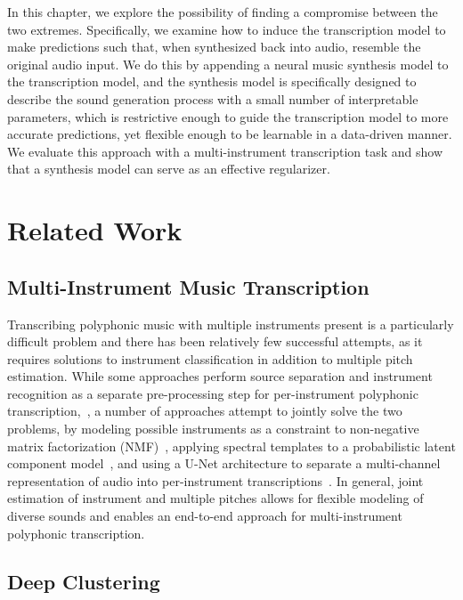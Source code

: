 In this chapter, we explore the possibility of finding a compromise between the two extremes.
Specifically, we examine how to induce the transcription model to make predictions such that, when synthesized back into audio, resemble the original audio input.
We do this by appending a neural music synthesis model to the transcription model, and the synthesis model is specifically designed to describe the sound generation process with a small number of interpretable parameters, which is restrictive enough to guide the transcription model to more accurate predictions, yet flexible enough to be learnable in a data-driven manner.
We evaluate this approach with a multi-instrument transcription task and show that a synthesis model can serve as an effective regularizer. %

\section{Related Work}


\subsection{Multi-Instrument Music Transcription}

Transcribing polyphonic music with multiple instruments present is a particularly difficult problem and there has been relatively few successful attempts, as it requires solutions to instrument classification in addition to multiple pitch estimation.
While some approaches perform source separation and instrument recognition as a separate pre-processing step for per-instrument polyphonic transcription,~\cite{heittola2009separation,itoyama2011bayesian}, a number of approaches attempt to jointly solve the two problems, by modeling possible instruments as a constraint to non-negative matrix factorization (NMF)~\cite{grindlay2009eigeninstruments}, applying spectral templates to a probabilistic latent component model~\cite{benetos2015probabilistic}, and using a U-Net architecture to separate a multi-channel representation of audio into per-instrument transcriptions~\cite{wu2019musicnet}.
In general, joint estimation of instrument and multiple pitches allows for flexible modeling of diverse sounds and enables an end-to-end approach for multi-instrument polyphonic transcription.


\subsection{Deep Clustering}

